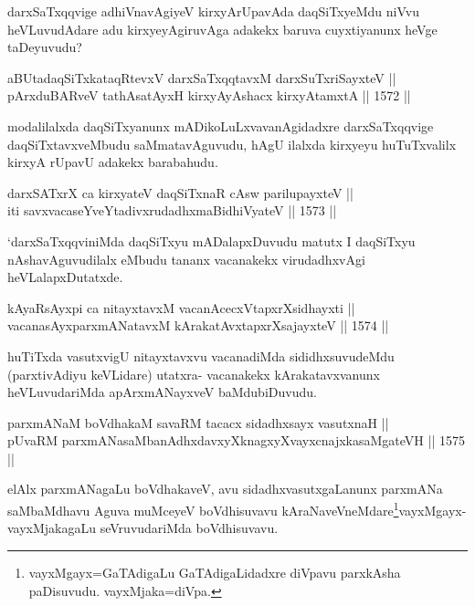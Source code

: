 \begin{artha}
darxSaTxqqvige adhiVnavAgiyeV kirxyArUpavAda daqSiTxyeMdu niVvu heVLuvudAdare adu kirxyeyAgiruvAga adakekx baruva cuyxtiyanunx heVge taDeyuvudu?
\end{artha}

\begin{shl}
aBUtadaqSiTxkataqRtevxV darxSaTxqqtavxM darxSuTxriSayxteV ||  \\
pArxduBARveV tathA\s satAyxH kirxyAyAshacx kirxyAtamxtA \hfill || 1572 ||  
\end{shl}

\begin{artha}
modalilalxda daqSiTxyanunx mADikoLuLxvavanAgidadxre darxSaTxqqvige daqSiTxtavxveMbudu saMmatavAguvudu, hAgU ilalxda kirxyeyu huTuTxvalilx kirxyA rUpavU adakekx barabahudu.
\end{artha}


\begin{shl}
darxSATxrX ca kirxyateV daqSiTxnaR cAsw parilupayxteV || \\
iti savxvacaseYveYtadivxrudadhxmaBidhiVyateV \hfill || 1573 ||  
\end{shl}

\begin{artha}
`darxSaTxqqviniMda daqSiTxyu mADalapxDuvudu matutx I daqSiTxyu nAshavAguvudilalx eMbudu tananx vacanakekx virudadhxvAgi heVLalapxDutatxde.
\end{artha}


\begin{shl}
kAyaRsAyxpi ca nitayxtavxM vacanAcecxVtapxrXsidhayxti ||  \\
vacanasAyxparxmANatavxM kArakatAvxtapxrXsajayxteV \hfill || 1574 ||  
\end{shl}

\begin{artha}
huTiTxda vasutxvigU nitayxtavxvu vacanadiMda sididhxsuvudeMdu (parxtivAdiyu keVLidare) utatxra- vacanakekx kArakatavxvanunx heVLuvudariMda apArxmANayxveV baMdubiDuvudu.
\end{artha}

\begin{shl}
parxmANaM boVdhakaM savaRM tacacx sidadhxsayx vasutxnaH || \\
pUvaRM parxmANasaMbanAdhxdavxyXknagxyXvayxcnajxkasaMgateVH \hfill || 1575 ||  
\end{shl}

\begin{artha}
elAlx parxmANagaLu boVdhakaveV, avu sidadhxvasutxgaLanunx parxmANa saMbaMdhavu Aguva muMceyeV boVdhisuvavu kAraNaveVneMdare\footnote{vayxMgayx=GaTAdigaLu GaTAdigaLidadxre diVpavu parxkAsha paDisuvudu. vayxMjaka=diVpa.}vayxMgayx-vayxMjakagaLu seVruvudariMda boVdhisuvavu.
\end{artha} 
